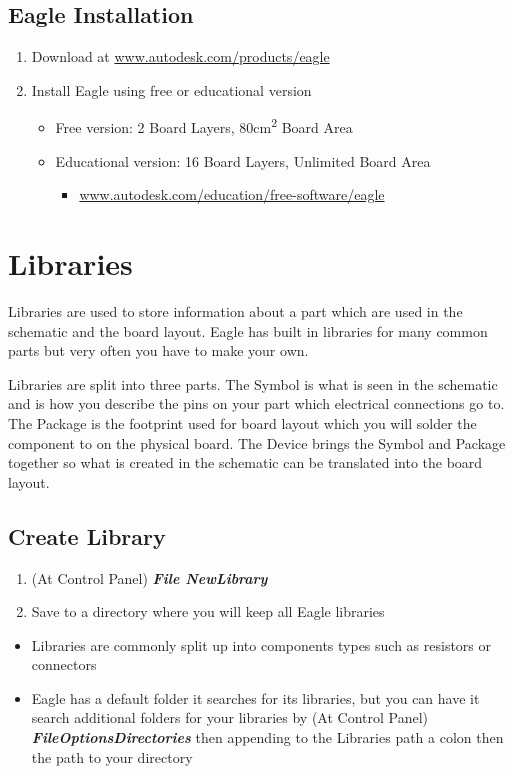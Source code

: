 \documentclass{article}
\begin{document}
\subsection{Eagle Installation}
\begin{enumerate}
    \item Download at \url{www.autodesk.com/products/eagle}
    \item Install Eagle using free or educational version
    \begin{itemize}
        \item Free version: 2 Board Layers, 80cm\textsuperscript{2} Board Area
        \item Educational version: 16 Board Layers, Unlimited Board Area
        \begin{itemize}
            \item \url{www.autodesk.com/education/free-software/eagle}
        \end{itemize}
    \end{itemize}
\end{enumerate}

\section{Libraries}
Libraries are used to store information about a part which are used in the schematic and the board layout. Eagle has built in libraries for many common parts but very often you have to make your own. \par
Libraries are split into three parts. The Symbol is what is seen in the schematic and is how you describe the pins on your part which electrical connections go to. The Package is the footprint used for board layout which you will solder the component to on the physical board. The Device brings the Symbol and Package together so what is created in the schematic can be translated into the board layout.

\subsection{Create Library} \label{create library}
\begin{enumerate}
    \item (At Control Panel) \textit{\textbf{File\textrightarrow
    New\textrightarrow Library}}
    \item Save to a directory where you will keep all Eagle libraries
\end{enumerate}
\begin{tcolorbox} [title=Tips \& Tricks]
    \begin{itemize}
        \item Libraries are commonly split up into components types such as resistors or connectors
        \item Eagle has a default folder it searches for its libraries, but you can have it search additional folders for your libraries by (At Control Panel) \textit{\textbf{File\textrightarrow Options\textrightarrow Directories}} then appending to the Libraries path a colon then the path to your directory
    \end{itemize}
\end{tcolorbox}
\end{document}
